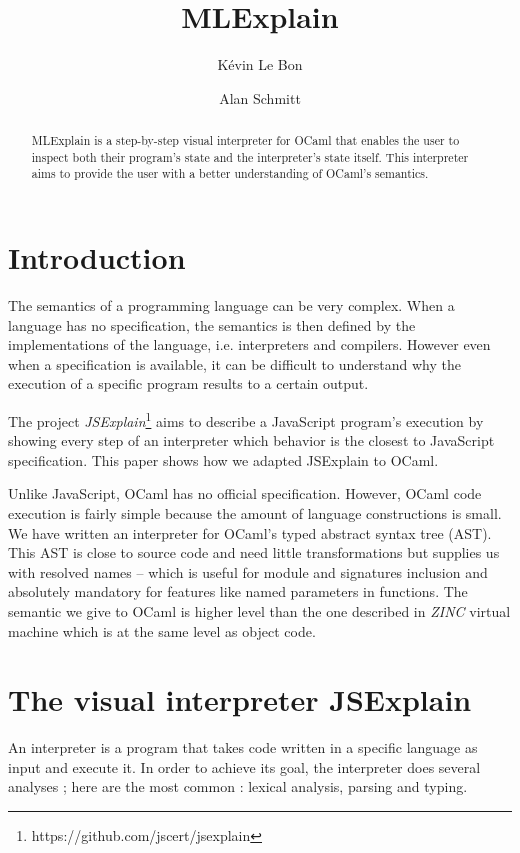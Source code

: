\documentclass[twocolumn]{article}
\author{ K\'evin Le Bon \and Alan Schmitt }
\title{MLExplain}
\begin{document}
\maketitle

\begin{abstract}
  MLExplain is a step-by-step visual interpreter for OCaml that enables the
  user to inspect both their program's state and the interpreter's state
  itself. This interpreter aims to provide the user with a better understanding
  of OCaml's semantics.
\end{abstract}

\section{Introduction}

The semantics of a programming language can be very complex. When a language
has no specification, the semantics is then defined by the implementations of
the language, i.e. interpreters and compilers. However even when a
specification is available, it can be difficult to understand why the execution
of a specific program results to a certain output.

The project \emph{JSExplain}\footnote{https://github.com/jscert/jsexplain} aims
to describe a JavaScript program's execution by showing every step of an
interpreter which behavior is the closest to JavaScript specification. This
paper shows how we adapted JSExplain to OCaml.

Unlike JavaScript, OCaml has no official specification. However, OCaml code
execution is fairly simple because the amount of language constructions is
small. We have written an interpreter for OCaml's typed abstract syntax tree
(AST). This AST is close to source code and need little transformations but
supplies us with resolved names -- which is useful for module and signatures
inclusion and absolutely mandatory for features like named parameters in
functions.  The semantic we give to OCaml is higher level than the one
described in \emph{ZINC} \cite{Leroy-ZINC} virtual machine which is at the same
level as object code.

\section{The visual interpreter JSExplain}

An interpreter is a program that takes code written in a specific language as
input and execute it. In order to achieve its goal, the interpreter does
several analyses ; here are the most common : lexical analysis, parsing and
typing.
\end{document}
